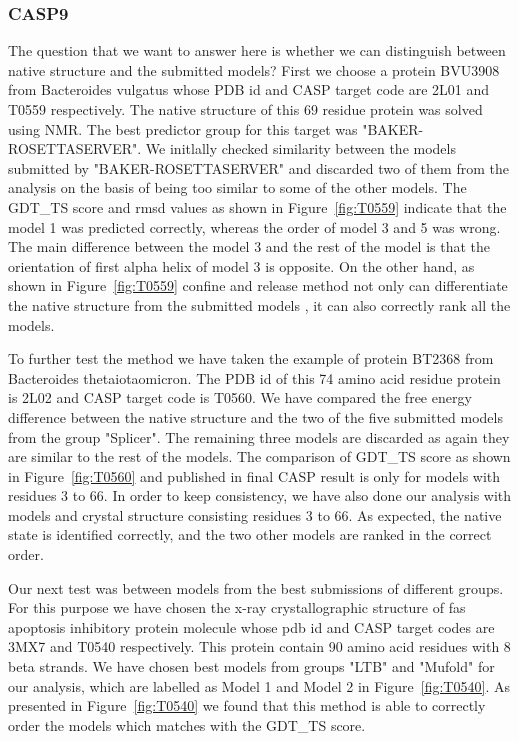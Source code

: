 \documentclass[12pt]{article}
\begin{document}
\subsubsection{CASP9}

The question that we want to answer here is whether we can distinguish between native structure and the submitted models? 
First we choose a protein BVU3908 from Bacteroides vulgatus whose PDB id and CASP target code are
2L01 and T0559 respectively. The native structure of this 69 residue protein was solved using NMR.
The best predictor group for this target was "BAKER-ROSETTASERVER".
We initlally checked similarity between the models submitted by "BAKER-ROSETTASERVER" and discarded two of them from the 
analysis on the basis of being too similar to some of the other models. The GDT\_TS score and rmsd
values as shown in Figure~\ref{fig:T0559} indicate that the model 1 was predicted correctly, 
whereas the order of model 3 and 5 was wrong. The main difference
between the model 3 and the rest of the model is that the orientation of first alpha helix of model 3 is opposite.
On the other hand, as shown in Figure~\ref{fig:T0559} confine and release method not only can differentiate the native 
structure from the submitted models , it can also correctly rank all the models.  

To further test the method we have taken the example of protein BT2368 from Bacteroides thetaiotaomicron. The PDB id of this 
74 amino acid residue protein is 2L02 and CASP target code is T0560. We have compared the free energy difference between 
the native structure and the two of the five submitted models from the group "Splicer". The remaining three models are discarded as 
again they are similar to the rest of the models. The comparison of GDT\_TS score as shown in 
Figure~\ref{fig:T0560} and published in final CASP result is only for models with residues 3 to 66. In order to keep
consistency, we have also done our analysis with models and crystal structure consisting residues 3 to 66. As expected,
the native state is identified correctly, and the two other models are ranked in the correct order.   

Our next test was between models from the best submissions of different groups. 
For this purpose we have chosen the x-ray crystallographic structure of 
fas apoptosis inhibitory protein molecule whose pdb id and CASP target codes are 3MX7 and T0540 respectively. 
This protein contain 90 amino acid residues with 8 beta strands. We have chosen best models from groups 
"LTB" and "Mufold" for our analysis, which are labelled as Model 1 and Model 2 in Figure~\ref{fig:T0540}. 
As presented in  Figure~\ref{fig:T0540} we found that this method is able to correctly order the models which matches 
with the GDT\_TS score. 
\end{document}
